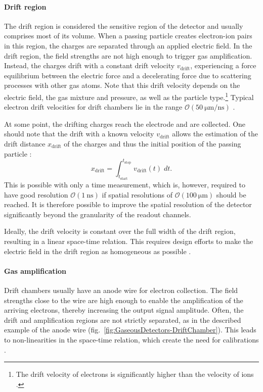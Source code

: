 \paragraph{Drift region}
The drift region is considered the sensitive region of the detector and usually comprises most of its volume. When a passing particle creates electron-ion pairs in this region, the charges are separated through an applied electric field. In the drift region, the field strengths are not high enough to trigger gas amplification. Instead, the charges drift with a constant drift velocity $v_\text{drift}$, experiencing a force equilibrium between the electric force and a decelerating force due to scattering processes with other gas atoms. Note that this drift velocity depends on the electric field, the gas mixture and pressure, as well as the particle type.\footnote{The drift velocity of electrons is significantly higher than the velocity of ions \cite{Book-KolanoskiWermes}.} Typical electron drift velocities for drift chambers lie in the range $\mathcal{O}(\SI{50}{\micro\meter/\nano\second})$ \cite{Book-KolanoskiWermes}.
\par At some point, the drifting charges reach the electrode and are collected. One should note that the drift with a known velocity $v_\text{drift}$ allows the estimation of the drift distance $x_\text{drift}$ of the charges and thus the initial position of the passing particle \cite{Book-KolanoskiWermes}:
\begin{equation*}
    x_\text{drift} = \int_{t_\text{start}}^{t_\text{stop}}v_\text{drift}(t)\;dt.
\end{equation*}
This is possible with only a time measurement, which is, however, required to have good resolution $\mathcal{O}(\SI{1}{\nano\second})$ if spatial resolutions of $\mathcal{O}(\SI{100}{\micro\meter})$ should be reached. It is therefore possible to improve the spatial resolution of the detector significantly beyond the granularity of the readout channels.
\par Ideally, the drift velocity is constant over the full width of the drift region, resulting in a linear space-time relation. This requires design efforts to make the electric field in the drift region as homogeneous as possible \cite{Book-KolanoskiWermes}.
\paragraph{Gas amplification} Drift chambers usually have an anode wire for electron collection. The field strengths close to the wire are high enough to enable the amplification of the arriving electrons, thereby increasing the output signal amplitude. Often, the drift and amplification regions are not strictly separated, as in the described example of the anode wire (fig.\ \ref{fig:GaseousDetectors-DriftChamber}). This leads to non-linearities in the space-time relation, which create the need for calibrations \cite{Book-KolanoskiWermes}.







